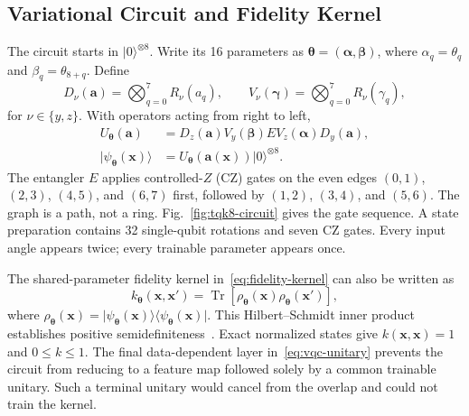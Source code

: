 \subsection{Variational Circuit and Fidelity Kernel}
\label{sec:framework-kernel}

The circuit starts in $\lvert0\rangle^{\otimes8}$. Write its 16 parameters as $\boldsymbol\theta=(\boldsymbol\alpha,\boldsymbol\beta)$, where $\alpha_q=\theta_q$ and $\beta_q=\theta_{8+q}$. Define
\begin{equation}
 D_\nu(\mathbf a)=\bigotimes_{q=0}^{7}R_\nu(a_q),
 \qquad
 V_\nu(\boldsymbol\gamma)=\bigotimes_{q=0}^{7}R_\nu(\gamma_q),
 \label{eq:circuit-layers}
\end{equation}
for $\nu\in\{y,z\}$. With operators acting from right to left,
\begin{align}
 U_{\boldsymbol\theta}(\mathbf a)
  &=D_z(\mathbf a)V_y(\boldsymbol\beta)E
                  V_z(\boldsymbol\alpha)D_y(\mathbf a),
 \label{eq:vqc-unitary}\\
 \lvert\psi_{\boldsymbol\theta}(\mathbf x)\rangle
  &=U_{\boldsymbol\theta}(\mathbf a(\mathbf x))
                         \lvert0\rangle^{\otimes8}.
 \label{eq:encoded-state}
\end{align}
The entangler $E$ applies controlled-$Z$ (CZ) gates on the even edges $(0,1)$, $(2,3)$, $(4,5)$, and $(6,7)$ first, followed by $(1,2)$, $(3,4)$, and $(5,6)$. The graph is a path, not a ring. Fig.~\ref{fig:tqk8-circuit} gives the gate sequence. A state preparation contains 32 single-qubit rotations and seven CZ gates. Every input angle appears twice; every trainable parameter appears once.



The shared-parameter fidelity kernel in~\eqref{eq:fidelity-kernel} can also be written as
\begin{equation}
 k_{\boldsymbol\theta}(\mathbf x,\mathbf x')=
 \operatorname{Tr}\!\left[\rho_{\boldsymbol\theta}(\mathbf x)
                           \rho_{\boldsymbol\theta}(\mathbf x')\right],
 \label{eq:density-kernel}
\end{equation}
where $\rho_{\boldsymbol\theta}(\mathbf x)=\lvert\psi_{\boldsymbol\theta}(\mathbf x)\rangle\langle\psi_{\boldsymbol\theta}(\mathbf x)\rvert$. This Hilbert--Schmidt inner product establishes positive semidefiniteness~\cite{schuld2019feature,havlicek2019supervised}. Exact normalized states give $k(\mathbf x,\mathbf x)=1$ and $0\leq k\leq1$. The final data-dependent layer in~\eqref{eq:vqc-unitary} prevents the circuit from reducing to a feature map followed solely by a common trainable unitary. Such a terminal unitary would cancel from the overlap and could not train the kernel.

